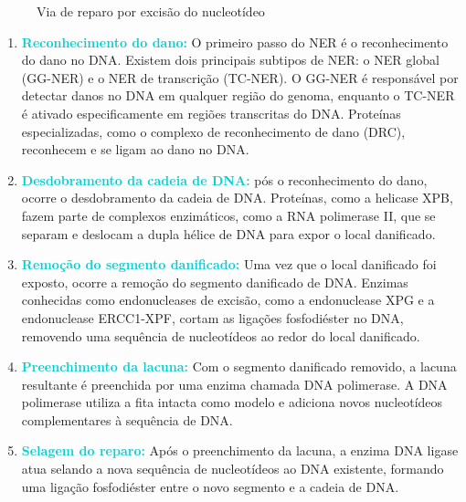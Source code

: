 \documentclass[11pt,a4paper]{article}
\begin{document}
	\begin{figure}[h]
		\centering
		\caption{Via de reparo por excisão do nucleotídeo}
		\label{fig:reparoExcisaoNucleotidio}
	\end{figure}

	\begin{enumerate}[label=\textcolor{CarnationPink}{\arabic*${}^\circ $}]
		\item \textcolor{DarkTurquoise}{\textbf{Reconhecimento do dano:}} O primeiro passo do NER é o reconhecimento do dano no DNA. Existem dois principais subtipos de NER: o NER global (GG-NER) e o NER de transcrição (TC-NER). O GG-NER é responsável por detectar danos no DNA em qualquer região do genoma, enquanto o TC-NER é ativado especificamente em regiões transcritas do DNA. Proteínas especializadas, como o complexo de reconhecimento de dano (DRC), reconhecem e se ligam ao dano no DNA.
		\item \textcolor{DarkTurquoise}{\textbf{Desdobramento da cadeia de DNA: }} pós o reconhecimento do dano, ocorre o desdobramento da cadeia de DNA. Proteínas, como a helicase XPB, fazem parte de complexos enzimáticos, como a RNA polimerase II, que se separam e deslocam a dupla hélice de DNA para expor o local danificado.
		\item \textcolor{DarkTurquoise}{\textbf{Remoção do segmento danificado:}}  Uma vez que o local danificado foi exposto, ocorre a remoção do segmento danificado de DNA. Enzimas conhecidas como endonucleases de excisão, como a endonuclease XPG e a endonuclease ERCC1-XPF, cortam as ligações fosfodiéster no DNA, removendo uma sequência de nucleotídeos ao redor do local danificado.
		\item \textcolor{DarkTurquoise}{\textbf{Preenchimento da lacuna:}} Com o segmento danificado removido, a lacuna resultante é preenchida por uma enzima chamada DNA polimerase. A DNA polimerase utiliza a fita intacta como modelo e adiciona novos nucleotídeos complementares à sequência de DNA.
		\item \textcolor{DarkTurquoise}{\textbf{Selagem do reparo:}} Após o preenchimento da lacuna, a enzima DNA ligase atua selando a nova sequência de nucleotídeos ao DNA existente, formando uma ligação fosfodiéster entre o novo segmento e a cadeia de DNA.
	\end{enumerate}
\end{document}
